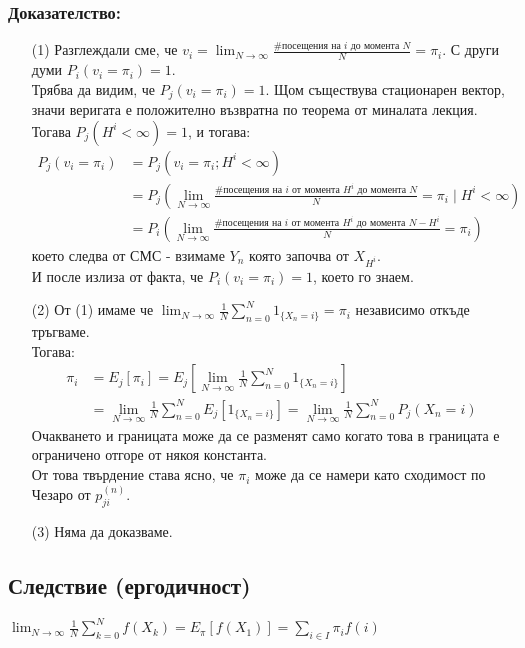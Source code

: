 \documentclass{article}
\begin{document}
\subsubsection*{Доказателство:}
\begin{enumerate}
\item[(1)] Разглеждали сме, че $v_i = \lim_{N\to\infty} \frac{\text{\# посещения на }i\text{ до момента }N}{N} = \pi_i$. С други думи $P_i(v_i = \pi_i) = 1$. \\
Трябва да видим, че $P_j(v_i = \pi_i) = 1$. Щом съществува стационарен вектор, значи веригата е положително възвратна по теорема от миналата лекция. \\
Тогава $P_j(H^i < \infty) = 1$, и тогава:
\begin{align*}
P_j(v_i = \pi_i) &= P_j(v_i = \pi_i; H^i < \infty) \\
&= P_j\left(\lim_{N\to\infty} \frac{\text{\# посещения на }i\text{ от момента }H^i\text{ до момента }N}{N} = \pi_i \mid H^i < \infty\right) \\
&= P_i\left(\lim_{N\to\infty} \frac{\text{\# посещения на }i\text{ от момента }H^i\text{ до момента }N-H^i}{N} = \pi_i\right)
\end{align*}
което следва от СМС - взимаме $Y_n$ която започва от $X_{H^i}$. \\
И после излиза от факта, че $P_i(v_i = \pi_i) = 1$, което го знаем.

\item[(2)] От (1) имаме че $\lim_{N\to\infty} \frac{1}{N}\sum_{n=0}^N 1_{\{X_n = i\}} = \pi_i$ независимо откъде тръгваме. \\
Тогава:
\begin{align*}
\pi_i &= E_j[\pi_i] = E_j\left[\lim_{N\to\infty} \frac{1}{N}\sum_{n=0}^N 1_{\{X_n = i\}}\right] \\
&= \lim_{N\to\infty} \frac{1}{N}\sum_{n=0}^N E_j[1_{\{X_n = i\}}] = \lim_{N\to\infty} \frac{1}{N}\sum_{n=0}^N P_j(X_n = i)
\end{align*}
Очакването и границата може да се разменят само когато това в границата е ограничено отгоре от някоя константа. \\
От това твърдение става ясно, че $\pi_i$ може да се намери като сходимост по Чезаро от $p_{ji}^{(n)}$.

\item[(3)] Няма да доказваме.
\end{enumerate}

\subsection{Следствие (ергодичност)}
$\lim_{N\to\infty} \frac{1}{N}\sum_{k=0}^N f(X_k) = E_\pi[f(X_1)] = \sum_{i \in I} \pi_i f(i)$
\end{document}

